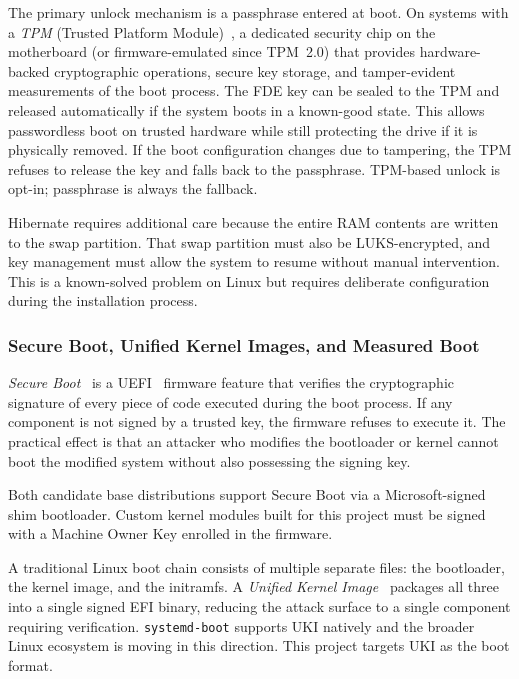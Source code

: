 The primary unlock mechanism is a passphrase entered at boot. On systems with
a \emph{TPM} (Trusted Platform Module)~\cite{archwiki:tpm}, a dedicated
security chip on the motherboard (or firmware-emulated since TPM~2.0) that
provides hardware-backed cryptographic operations, secure key storage, and
tamper-evident measurements of the boot process. The FDE key can be sealed to the TPM and released automatically
if the system boots in a known-good state. This allows passwordless boot on
trusted hardware while still protecting the drive if it is physically removed.
If the boot configuration changes due to tampering, the TPM refuses to release
the key and falls back to the passphrase. TPM-based unlock is opt-in;
passphrase is always the fallback.

Hibernate requires additional care because the entire RAM contents are written
to the swap partition. That swap partition must also be LUKS-encrypted, and
key management must allow the system to resume without manual intervention.
This is a known-solved problem on Linux but requires deliberate configuration
during the installation process.

\subsubsection{Secure Boot, Unified Kernel Images, and Measured Boot}
\label{sec:secureboot}

\emph{Secure Boot}~\cite{archwiki:secureboot} is a UEFI~\cite{uefi} firmware feature that verifies the cryptographic
signature of every piece of code executed during the boot process. If any
component is not signed by a trusted key, the firmware refuses to execute it.
The practical effect is that an attacker who modifies the bootloader or kernel
cannot boot the modified system without also possessing the signing key.

Both candidate base distributions support Secure Boot via a Microsoft-signed
shim bootloader. Custom kernel modules built for this project must be signed
with a Machine Owner Key enrolled in the firmware.

A traditional Linux boot chain consists of multiple separate files: the
bootloader, the kernel image, and the initramfs. A \emph{Unified Kernel Image}~\cite{archwiki:uki}
packages all three into a single signed EFI binary, reducing the attack
surface to a single component requiring verification. \texttt{systemd-boot}
supports UKI natively and the broader Linux ecosystem is moving in this
direction. This project targets UKI as the boot format.

